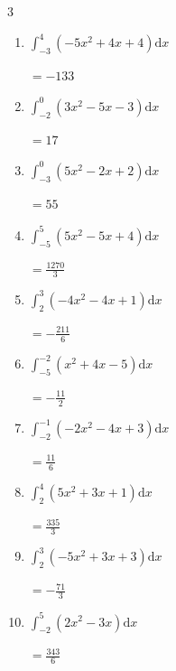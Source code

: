 \begin{multicols}{3}
\begin{enumerate}
        $\displaystyle =-134$

\columnbreak %

  \item $\displaystyle \int_{-3}^{4}\left( -5x^{2}+4x+4 \right) \mathrm{d}x$

        $\displaystyle =-133$

  \item $\displaystyle \int_{-2}^{0}\left( 3x^{2}-5x-3 \right) \mathrm{d}x$

        $\displaystyle =17$

  \item $\displaystyle \int_{-3}^{0}\left( 5x^{2}-2x+2 \right) \mathrm{d}x$

        $\displaystyle =55$

  \item $\displaystyle \int_{-5}^{5}\left( 5x^{2}-5x+4 \right) \mathrm{d}x$

        $\displaystyle =\frac{1270}{3}$

  \item $\displaystyle \int_{2}^{3}\left( -4x^{2}-4x+1 \right) \mathrm{d}x$

        $\displaystyle =-\frac{211}{6}$

\columnbreak %

\resetques

  \item $\displaystyle \int_{-5}^{-2}\left( x^{2}+4x-5 \right) \mathrm{d}x$

        $\displaystyle =-\frac{11}{2}$

  \item $\displaystyle \int_{-2}^{-1}\left( -2x^{2}-4x+3 \right) \mathrm{d}x$

        $\displaystyle =\frac{11}{6}$

  \item $\displaystyle \int_{2}^{4}\left( 5x^{2}+3x+1 \right) \mathrm{d}x$

        $\displaystyle =\frac{335}{3}$

  \item $\displaystyle \int_{2}^{3}\left( -5x^{2}+3x+3 \right) \mathrm{d}x$

        $\displaystyle =-\frac{71}{3}$

  \item $\displaystyle \int_{-2}^{5}\left( 2x^{2}-3x \right) \mathrm{d}x$

        $\displaystyle =\frac{343}{6}$

\columnbreak %


\end{enumerate}
\end{multicols}
